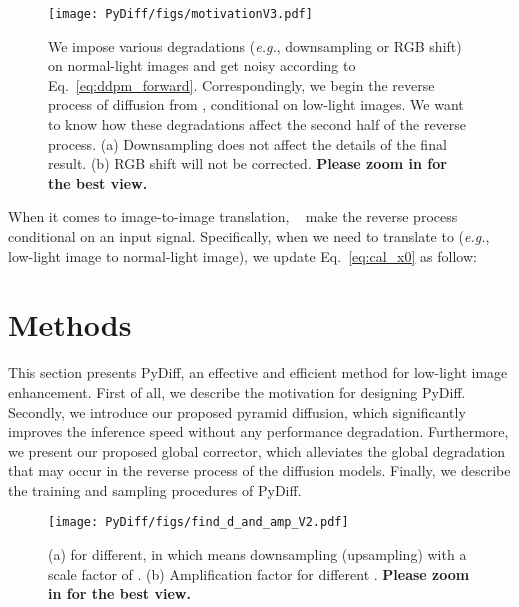 \documentclass{article}
\def\eg{\emph{e.g.}}
\begin{document}
\begin{figure}[tb]
\begin{center}
        \texttt{[image: PyDiff/figs/motivationV3.pdf]}
\end{center}
    
   \caption{We impose various degradations (\eg, downsampling or RGB shift) on normal-light images and get noisy  according to Eq.~\eqref{eq:ddpm_forward}. Correspondingly, we begin the reverse process of diffusion from , conditional on low-light images. We want to know how these degradations affect the second half of the reverse process. (a) Downsampling does not affect the details of the final result. (b) RGB shift will not be corrected. \textbf{Please zoom in for the best view.}} 
\label{fig:moti}
  \end{figure}

When it comes to image-to-image translation, ~\cite{saharia2022palette,saharia2022image,choi2021ilvr} make the reverse process conditional on an input signal. Specifically, when we need to translate  to  (\eg, low-light image to normal-light image), we update Eq.~\eqref{eq:cal_x0} as follow:


\nocite{saharia2022image}
\nocite{saharia2022palette}



\section{Methods}




This section presents PyDiff, an effective and efficient method for low-light image enhancement. First of all, we describe the motivation for designing PyDiff. Secondly, we introduce our proposed pyramid diffusion, which significantly improves the inference speed without any performance degradation. Furthermore, we present our proposed global corrector, which alleviates the global degradation that may occur in the reverse process of the diffusion models. Finally, we describe the training and sampling procedures of PyDiff.

\begin{figure}[tb]
\begin{center}
        \texttt{[image: PyDiff/figs/find\_d\_and\_amp\_V2.pdf]}
\end{center}
    
   \caption{(a)  for different, in which  means downsampling (upsampling) with a scale factor of . (b) Amplification factor  for different . \textbf{Please zoom in for the best view.}} 
\label{fig:amplify_scale}
  \end{figure}
\end{document}
